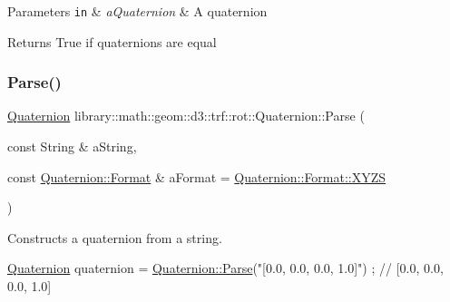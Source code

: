 \begin{DoxyParams}[1]{Parameters}
\mbox{\tt in}  & {\em a\+Quaternion} & A quaternion \\
\hline
\end{DoxyParams}
\begin{DoxyReturn}{Returns}
True if quaternions are equal 
\end{DoxyReturn}
\mbox{\label{classlibrary_1_1math_1_1geom_1_1d3_1_1trf_1_1rot_1_1_quaternion_af56e135faf297a4b48baa5a2cc4f6b00}} 
\subsubsection{\texorpdfstring{Parse()}{Parse()}}
{\footnotesize\ttfamily \hyperlink{classlibrary_1_1math_1_1geom_1_1d3_1_1trf_1_1rot_1_1_quaternion}{Quaternion} library\+::math\+::geom\+::d3\+::trf\+::rot\+::\+Quaternion\+::\+Parse (\begin{DoxyParamCaption}\item[{const String \&}]{a\+String,  }\item[{const \hyperlink{classlibrary_1_1math_1_1geom_1_1d3_1_1trf_1_1rot_1_1_quaternion_aa86c54f6157891b2f1a517c672d6deec}{Quaternion\+::\+Format} \&}]{a\+Format = {\ttfamily \hyperlink{classlibrary_1_1math_1_1geom_1_1d3_1_1trf_1_1rot_1_1_quaternion_aa86c54f6157891b2f1a517c672d6deeca11c51ecd5dc6f86ba3c1ae79e21482f5}{Quaternion\+::\+Format\+::\+X\+Y\+ZS}} }\end{DoxyParamCaption})\hspace{0.3cm}{\ttfamily [static]}}



Constructs a quaternion from a string. 


\begin{DoxyCode}
\hyperlink{classlibrary_1_1math_1_1geom_1_1d3_1_1trf_1_1rot_1_1_quaternion_a1b8794cce68c5ee86dd50f9ba53635fa}{Quaternion} quaternion = \hyperlink{classlibrary_1_1math_1_1geom_1_1d3_1_1trf_1_1rot_1_1_quaternion_af56e135faf297a4b48baa5a2cc4f6b00}{Quaternion::Parse}(\textcolor{stringliteral}{"[0.0, 0.0, 0.0, 1.0]"}) ; \textcolor{comment}{// [0.0,
       0.0, 0.0, 1.0]}
\end{DoxyCode}



